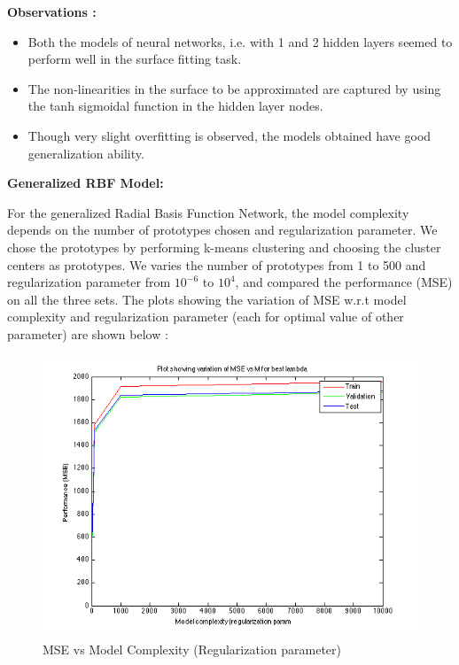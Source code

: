 \documentclass{article}
\begin{document}
\textbf{Observations :}
\begin{itemize}
\item Both the models of neural networks, i.e. with 1 and 2 hidden layers seemed to perform well in the surface fitting task.
\item The non-linearities in the surface to be approximated are captured by using the tanh sigmoidal function in the hidden layer nodes. 
\item Though very slight overfitting is observed, the models obtained have good generalization ability.  

\end{itemize}


\textbf{Generalized RBF Model:}

For the generalized Radial Basis Function Network, the model complexity depends on the number of prototypes chosen and regularization parameter. We chose the prototypes by performing k-means clustering and choosing the cluster centers as prototypes. We varies the number of prototypes from 1 to 500 and regularization parameter from $10^{-6}$ to $10^4$, and compared the performance (MSE) on all the three sets. The plots showing the variation of MSE w.r.t model complexity and regularization parameter (each for optimal value of other parameter) are shown below :

\begin{figure}[H]
\centering
\includegraphics[width=0.8\linewidth]{Regression/rbfnn_bivariate/mse_lambda.png}
\caption{MSE vs Model Complexity (Regularization parameter)}
\end{figure}
\end{document}
